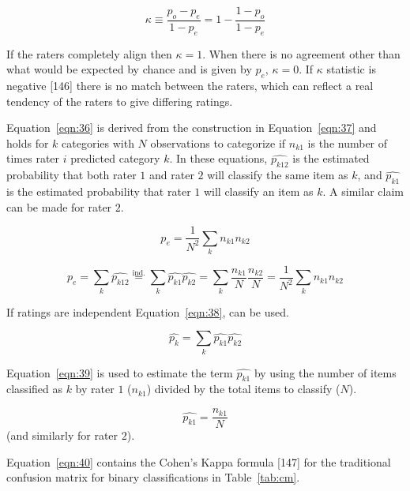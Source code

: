 \documentclass[preprint,12pt]{elsarticle}
\begin{document}
\begin{equation}
	\kappa \equiv {\frac {p_{o}-p_{e}}{1-p_{e}}}=1-{\frac {1-p_{o}}{1-p_{e}}}
	\label{eqn:35}
\end{equation}

If the raters completely align then $\kappa = 1$. When there is no agreement other than what would be expected by chance and is given by $p_{e}$, $\kappa = 0$. If $\kappa$ statistic is negative [146] there is no match between the raters, which can reflect a real tendency of the raters to give differing ratings.

Equation~\ref{eqn:36} is derived from the construction in Equation~\ref{eqn:37} and holds for $k$ categories with $N$ observations to categorize if $n_{k1}$ is the number of times rater $i$ predicted category $k$. In these equations, ${\widehat{p_{k12}}}$ is the estimated probability that both rater $1$ and rater $2$ will classify the same item as $k$, and ${\widehat {p_{k1}}}$ is the estimated probability that rater $1$ will classify an item as $k$. A similar claim can be made for rater $2$.

\begin{equation}
	p_{e}={\frac {1}{N^{2}}}\sum_{k}n_{k1}n_{k2}
	\label{eqn:36}
\end{equation}

\begin{equation}
	p_{e}=\sum_{k}{\widehat {p_{k12}}}{\overset{\text{ind.}}{=}}\sum_{k}{\widehat {p_{k1}}}{\widehat {p_{k2}}}=\sum_{k}{\frac {n_{k1}}{N}}{\frac {n_{k2}}{N}}={\frac {1}{N^{2}}}\sum_{k}n_{k1}n_{k2}
	\label{eqn:37}
\end{equation}

If ratings are independent Equation~\ref{eqn:38}, can be used.

\begin{equation}
	\textstyle{\widehat{p_{k}}}=\sum_{k}{\widehat{p_{k1}}}{\widehat {p_{k2}}}
	\label{eqn:38}
\end{equation}

Equation~\ref{eqn:39} is used to estimate the term $\widehat{p_{k1}}$ by using the number of items classified as $k$ by rater $1$ ($n_{k1}$) divided by the total items to classify ($N$).

\begin{equation}
	\widehat {p_{k1}}=\frac{n_{k1}}{N}
	\label{eqn:39}
\end{equation}
 (and similarly for rater $2$).
 
Equation~\ref{eqn:40} contains the Cohen's Kappa formula [147] for the traditional confusion matrix for binary classifications in Table~\ref{tab:cm}.
\end{document}

